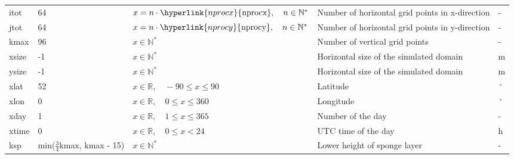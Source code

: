 \documentclass[twoside,11pt,fleqn,a4paper,english,openright]{report}
\begin{document}
\begin{center}
  \tablehead{
  }
  \tabletail{
  }
  \tablelasttail{
        &&&&\\\hline
  }
\begin{supertabular}{|l|p{1.6cm}|p{5cm}|p{6.3cm}|l|}
  itot		& 64		& $x = n \cdot \hyperlink{nprocx}{\text{nprocx}}, \quad n \in \mathbb{N}^*$	& Number of horizontal grid points in x-direction	& -\\
  jtot		& 64		& $x = n \cdot \hyperlink{nprocy}{\text{nprocy}}, \quad n \in \mathbb{N}^*$	& Number of horizontal grid points in y-direction	& -\\
  kmax		& 96		& $x \in \mathbb{N}^*$		& Number of vertical grid points		& -\\
  xsize		& -1		& $x \in \mathbb{N}^*$		& Horizontal size of the simulated domain	& m\\
  ysize		& -1		& $x \in \mathbb{N}^*$		& Horizontal size of the simulated domain	& m\\
  xlat		& 52	& $x \in \mathbb{R}, \quad -90 \leq x \leq 90$			& Latitude					& $\,^{\circ}$\\
  xlon		& 0		& $x \in \mathbb{R}, \quad 0 \leq x \leq 360$			& Longitude					& $\,^{\circ}$\\
  xday		& 1		& $x \in \mathbb{R}, \quad 1 \leq x \leq 365$	& Number of the day				& -\\
  xtime		& 0		& $x \in \mathbb{R}, \quad 0 \leq x < 24$	& UTC time of the day				& h\\
  ksp		& \scriptsize min($\frac{3}{4}$kmax, kmax - 15)	& $x \in \mathbb{N}^*$	& Lower height of sponge layer			& -\\
\end{supertabular}
\end{center}
\end{document}
